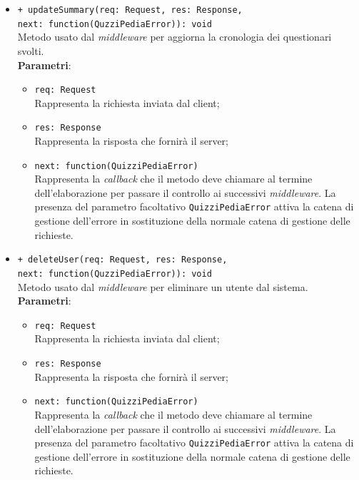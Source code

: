 \begin{itemize}
\begin{itemize}
\begin{itemize}
		 \end{itemize}
		  \item
		\texttt{+ updateSummary(req: Request, res: Response, \\next: function(QuzziPediaError)): void} \\
		Metodo usato dal \textit{middleware} per aggiorna la cronologia dei questionari svolti. \\
		\textbf{Parametri}:
		 \begin{itemize}
		  \item
			\texttt{req: Request} \\
			Rappresenta la richiesta inviata dal client;
		  \item
			\texttt{res: Response} \\
			Rappresenta la risposta che fornirà il server;
		  \item
		    \texttt{next: function(QuizziPediaError)} \\
			Rappresenta la \textit{callback} che il metodo deve chiamare al termine dell'elaborazione per passare il controllo ai successivi \textit{middleware}. La presenza del parametro facoltativo \texttt{QuizziPediaError} attiva la catena di gestione dell'errore in sostituzione della normale catena di gestione delle richieste.
		 \end{itemize}
		 \item
		 \texttt{+ deleteUser(req: Request, res: Response, \\next: function(QuzziPediaError)): void} \\
		Metodo usato dal \textit{middleware} per eliminare un utente dal sistema. \\
		\textbf{Parametri}:
		 \begin{itemize}
		  \item
			\texttt{req: Request} \\
			Rappresenta la richiesta inviata dal client;
		  \item
			\texttt{res: Response} \\
			Rappresenta la risposta che fornirà il server;
		  \item
		    \texttt{next: function(QuizziPediaError)} \\
			Rappresenta la \textit{callback} che il metodo deve chiamare al termine dell'elaborazione per passare il controllo ai successivi \textit{middleware}. La presenza del parametro facoltativo \texttt{QuizziPediaError} attiva la catena di gestione dell'errore in sostituzione della normale catena di gestione delle richieste.

\end{itemize}
\end{itemize}
\end{itemize}
